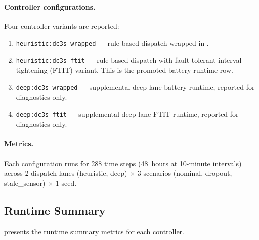 \paragraph{Controller configurations.}  Four controller variants are reported:
\begin{enumerate}[nosep]
  \item \texttt{heuristic:dc3s\_wrapped} --- rule-based dispatch wrapped in \dcs{}.
  \item \texttt{heuristic:dc3s\_ftit} --- rule-based dispatch with
        fault-tolerant interval tightening (FTIT) variant.  This is the promoted
        battery runtime row.
  \item \texttt{deep:dc3s\_wrapped} --- supplemental deep-lane battery runtime,
        reported for diagnostics only.
  \item \texttt{deep:dc3s\_ftit} --- supplemental deep-lane FTIT runtime,
        reported for diagnostics only.
\end{enumerate}

\paragraph{Metrics.}  Each configuration runs for 288 time steps (48~hours at
10-minute intervals) across 2 dispatch lanes (heuristic, deep) $\times$ 3 scenarios
(nominal, dropout, stale\_sensor) $\times$ 1 seed.

\subsection{Runtime Summary}

 presents the runtime summary metrics for each controller.

\begin{table}[h]
\caption{Battery domain runtime summary (288 steps per controller).}
\label{tab:battery_runtime}
\centering\small
{}
\end{table}

